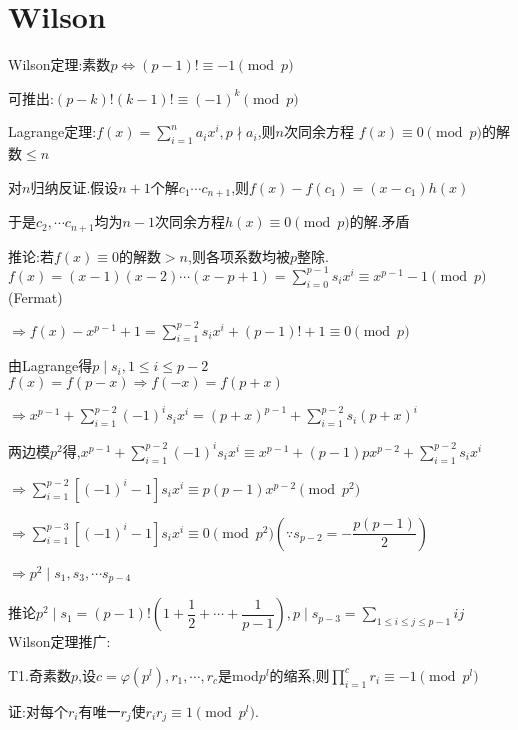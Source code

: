 
\section{Wilson}
Wilson定理:素数$ p \Leftrightarrow (p-1)!\equiv -1 \pmod p$

可推出:$ (p-k)!(k-1)!\equiv (-1)^k \pmod p$

Lagrange定理:$ f(x)=\sum_{i=1}^{n}{a_ix^i},p \nmid a_i$,则$ n$次同余方程
$ f(x) \equiv 0  \pmod p$的解数$  \le n$

对$ n$归纳反证.假设$ n+1$个解$ c_1\cdots c_{n+1}$,则$ f(x)-f(c_1)=(x-c_1)h(x)$

于是$ c_2,\cdots c_{n+1}$均为$ n-1$次同余方程$ h(x)\equiv 0 \pmod p$的解.矛盾

推论:若$ f(x)\equiv 0$的解数$ >n$,则各项系数均被$ p$整除.
\\

$ f(x)=(x-1)(x-2)\cdots (x-p+1)=\sum_{i=0}^{p-1}{s_ix^i}\equiv x^{p-1}-1 \pmod p $(Fermat)

$ \Rightarrow f(x)-x^{p-1}+1=\sum_{i=1}^{p-2}{s_ix^i}+(p-1)!+1\equiv 0 \pmod p$ 

由Lagrange得$ p\mid s_i,1\le i \le p-2$
\\

$ f(x)=f(p-x)\Rightarrow f(-x)=f(p+x)$ 

$ \Rightarrow x^{p-1}+\sum_{i=1}^{p-2}{(-1)^is_ix^i}=(p+x)^{p-1}+\sum_{i=1}^{p-2}{s_i(p+x)^i}$

两边模$ p^2$得,$ x^{p-1}+\sum_{i=1}^{p-2}{(-1)^is_ix^i}\equiv x^{p-1}+(p-1)px^{p-2}+\sum_{i=1}^{p-2}{s_ix^i}$

$ \Rightarrow \sum_{i=1}^{p-2}{[(-1)^i-1]s_ix^i}\equiv p(p-1)x^{p-2}\pmod {p^2}$ 

$ \Rightarrow \sum_{i=1}^{p-3}{[(-1)^i-1]s_ix^i}\equiv 0 \pmod {p^2}(\because s_{p-2}=-\dfrac{p(p-1)}{2})$

$ \Rightarrow p^2 \mid s_1,s_3,\cdots s_{p-4}$

推论$ p^2 \mid s_1=(p-1)!(1+\dfrac{1}{2}+\cdots+\dfrac{1}{p-1}),p \mid s_{p-3}=\sum_{1\le i\le j\le p-1}{ij}$
\\

Wilson定理推广:

T1.奇素数$ p$,设$ c=\varphi(p^l),r_1,\cdots,r_c$是mod$ p^l$的缩系,则$ \prod_{i=1}^{c}{r_i}\equiv -1 \pmod{p^l}$

证:对每个$ r_i$有唯一$ r_j$使$ r_ir_j\equiv1\pmod{p^l}.$

